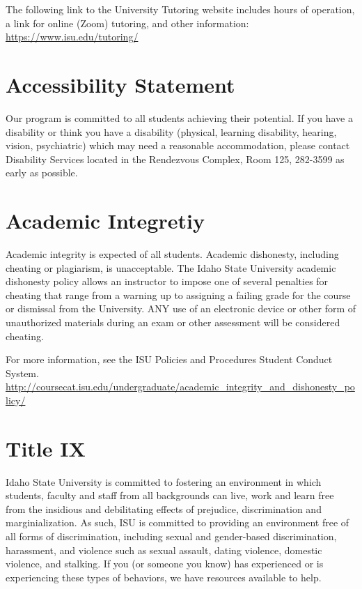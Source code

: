 \documentclass[11pt]{article}\usepackage[]{graphicx}\usepackage[]{xcolor}
\begin{document}
The following link to the University Tutoring website includes hours of operation, a link for online (Zoom) tutoring, and other information: \url{https://www.isu.edu/tutoring/}

\section{Accessibility Statement}

Our program is committed to all students achieving their potential. 
If you have a disability or think you have a disability (physical, learning disability, hearing, vision, psychiatric) which may need a reasonable accommodation, please contact Disability Services located in the Rendezvous Complex, Room 125, 282-3599 as early as possible.

\section{Academic Integretiy}

Academic integrity is expected of all students. Academic dishonesty, including cheating or plagiarism, is unacceptable. 
The Idaho State University academic dishonesty policy allows an instructor to impose one of several penalties for cheating that range from a warning up to assigning a failing grade for the course or dismissal from the University. 
ANY use of an electronic device or other form of unauthorized materials during an exam or other assessment will be considered cheating. 

For more information, see the ISU Policies and Procedures Student Conduct System.
\url{http://coursecat.isu.edu/undergraduate/academic\_integrity\_and\_dishonesty\_policy/}


\section{Title IX}

Idaho State University is committed to fostering an environment in which students, faculty and staff from all backgrounds can live, work and learn free from the insidious and debilitating effects of prejudice, discrimination and marginialization.
As such, ISU is committed to providing an environment free of all forms of discrimination, including sexual and gender-based discrimination, harassment, and violence such as sexual assault, dating violence, domestic violence, and stalking.
If you (or someone you know) has experienced or is experiencing these types of behaviors, we have resources available to help.  
\end{document}

